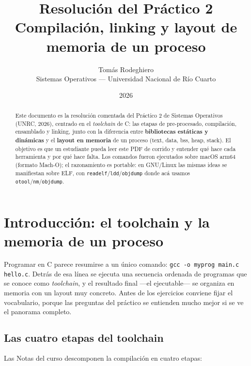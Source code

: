 \documentclass[11pt,a4paper]{article}
\title{
    \vspace{-2.5em}
    \textbf{Resolución del Práctico 2} \\[0.3em]
    \large Compilación, linking y layout de memoria de un proceso
}
\author{
    Tomás Rodeghiero \\
    \small Sistemas Operativos --- Universidad Nacional de Río Cuarto
}
\date{2026}
\begin{document}
\maketitle

\begin{abstract}
\noindent
Este documento es la resolución comentada del Práctico 2 de Sistemas
Operativos (UNRC, 2026), centrado en el \emph{toolchain} de C: las
etapas de pre-procesado, compilación, ensamblado y linking, junto con
la diferencia entre \textbf{bibliotecas estáticas y dinámicas} y el
\textbf{layout en memoria} de un proceso (text, data, bss, heap,
stack). El objetivo es que un estudiante pueda leer este PDF de
corrido y entender qué hace cada herramienta y por qué hace falta.
Los comandos fueron ejecutados sobre macOS arm64 (formato Mach-O); el
razonamiento es portable: en GNU/Linux las mismas ideas se manifiestan
sobre ELF, con \texttt{readelf}/\texttt{ldd}/\texttt{objdump} donde acá
usamos \texttt{otool}/\texttt{nm}/\texttt{objdump}.
\end{abstract}

\tableofcontents
\bigskip

\section{Introducción: el toolchain y la memoria de un proceso}

Programar en C parece resumirse a un único comando: \texttt{gcc -o
myprog main.c hello.c}. Detrás de esa línea se ejecuta una secuencia
ordenada de programas que se conoce como \emph{toolchain}, y el
resultado final ---el ejecutable--- se organiza en memoria con un
layout muy concreto. Antes de los ejercicios conviene fijar el
vocabulario, porque las preguntas del práctico se entienden mucho
mejor si se ve el panorama completo.

\subsection*{Las cuatro etapas del toolchain}

Las Notas del curso descomponen la compilación en cuatro etapas:
\end{document}
